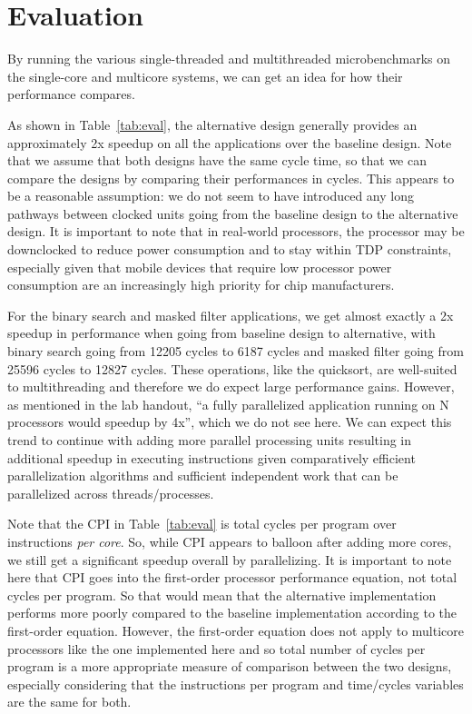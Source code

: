 \documentclass[10pt]{article}
\begin{document}
\section{Evaluation}

By running the various single-threaded and multithreaded microbenchmarks on the single-core and multicore systems, we can get an idea for how their performance compares. \par

As shown in Table~\ref{tab:eval}, the alternative design generally provides an approximately 2x speedup on all the applications over the baseline design. Note that we assume that both designs have the same cycle time, so that we can compare the designs by comparing their performances in cycles. This appears to be a reasonable assumption: we do not seem to have introduced any long pathways between clocked units going from the baseline design to the alternative design. It is important to note that in real-world processors, the processor may be downclocked to reduce power consumption and to stay within TDP constraints, especially given that mobile devices that require low processor power consumption are an increasingly high priority for chip manufacturers. \par

For the binary search and masked filter applications, we get almost exactly a 2x speedup in performance when going from baseline design to alternative, with binary search going from 12205 cycles to 6187 cycles and masked filter going from 25596 cycles to 12827 cycles. These operations, like the quicksort, are well-suited to multithreading and therefore we do expect large performance gains. However, as mentioned in the lab handout, ``a fully parallelized application running on N processors would speedup by 4x'', which we do not see here. We can expect this trend to continue with adding more parallel processing units resulting in additional speedup in executing instructions given comparatively efficient parallelization algorithms and sufficient independent work that can be parallelized across threads/processes. \par

Note that the CPI in Table~\ref{tab:eval} is total cycles per program over instructions \textit{per core}. So, while CPI appears to balloon after adding more cores, we still get a significant speedup overall by parallelizing. It is important to note here that CPI goes into the first-order processor performance equation, not total cycles per program. So that would mean that the alternative implementation performs more poorly compared to the baseline implementation according to the first-order equation. However, the first-order equation does not apply to multicore processors like the one implemented here and so total number of cycles per program is a more appropriate measure of comparison between the two designs, especially considering that the instructions per program and time/cycles variables are the same for both. \par
\end{document}
